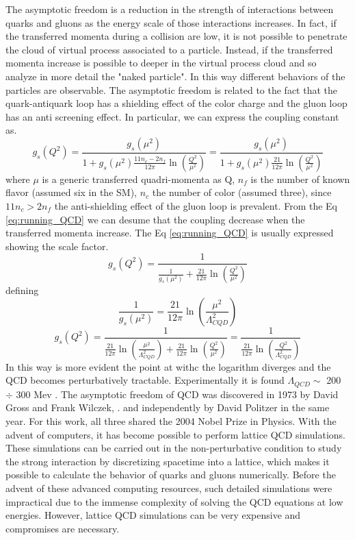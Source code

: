 \documentclass[12pt,a4paper]{book}
\begin{document}
	The asymptotic freedom is a reduction in the strength of interactions between quarks and gluons as the energy scale of those interactions increases. In fact, if the transferred momenta during a collision are low, it is not possible to penetrate the cloud of virtual process associated to a particle. Instead, if the transferred momenta increase is possible to deeper in the virtual process cloud and so analyze in more detail the "naked particle". In this way different behaviors of the particles are observable. The asymptotic freedom is related to the fact that the quark-antiquark loop has a shielding effect of the color charge and the gluon loop has an anti screening effect. In particular, we can express the coupling constant as.
	\begin{equation}
		g_s(Q^2)= \frac{g_s(\mu^2)}{1+g_s(\mu^2) \frac{11 n_c- 2n_f}{12\pi} \ln\left(\frac{Q^2}{\mu^2}\right)} = \frac{g_s(\mu^2)}{1+g_s(\mu^2) \frac{21}{12\pi} \ln\left(\frac{Q^2}{\mu^2}\right)}
		\label{eq:running_QCD}
	\end{equation}
	where $\mu$ is a generic transferred quadri-momenta as Q, $n_f$ is the number of known flavor (assumed six in the SM), $n_c$ the number of color (assumed three), since $11n_c>2n_f$ the anti-shielding effect of the gluon loop is prevalent. From the Eq \ref{eq:running_QCD} we can desume that the coupling decrease when the transferred momenta increase. The Eq \ref{eq:running_QCD} is usually expressed showing the scale factor. 
	\begin{equation}
		g_s(Q^2)= \frac{1}{\frac{1}{g_s(\mu^2)}+ \frac{21}{12\pi} \ln\left(\frac{Q^2}{\mu^2}\right)}
		\label{eq:running_QCD2}
	\end{equation} 
	defining 
	\begin{equation}
		\frac{1}{g_s(\mu^2)}= \frac{21}{12\pi} \ln\left(\frac{\mu^2}{\Lambda_{CQD}^2}\right)
	\end{equation} 
	\begin{equation}
		g_s(Q^2)=  \frac{1}{\frac{21}{12\pi} \ln\left(\frac{\mu^2}{\Lambda_{CQD}^2}\right)+ \frac{21}{12\pi} \ln\left(\frac{Q^2}{\mu^2}\right) }
		=\frac{1}{\frac{21}{12\pi} \ln \left(\frac{Q^2}{\Lambda_{CQD}^2}\right)}
		\label{eq:running_QCD_scale_factor}
	\end{equation} 
	In this way is more evident the point at withc the logarithm diverges and the QCD becomes perturbatively tractable. Experimentally it is found $\Lambda_{QCD} \sim$ 200 $\div$ 300 Mev \cite{Semprini}. The asymptotic freedom of QCD was discovered in 1973 by David Gross and Frank Wilczek, \cite{DAVIDPOLITZER1974129}. and independently by David Politzer in the same year. For this work, all three shared the 2004 Nobel Prize in Physics.
	With the advent of computers, it has become possible to perform lattice QCD simulations. These simulations can be carried out in the non-perturbative condition to study the strong interaction by discretizing spacetime into a lattice, which makes it possible to calculate the behavior of quarks and gluons numerically. Before the advent of these advanced computing resources, such detailed simulations were impractical due to the immense complexity of solving the QCD equations at low energies. However, lattice QCD simulations can be very expensive and compromises are necessary.
\end{document}
